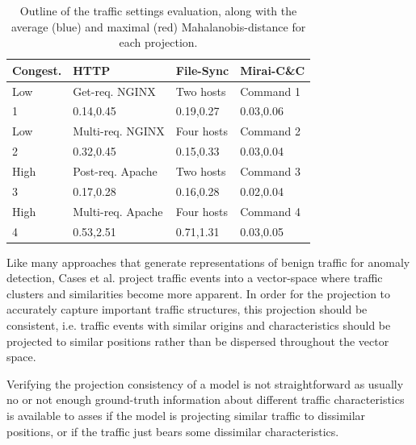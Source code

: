 \documentclass[conference]{IEEEtran}
\begin{document}
\begin{table}
\centering
\begin{tabular}{p{1cm}|p{2.3cm}|p{1.5cm}|p{1.6cm}}
Congest.&HTTP&File-Sync & Mirai-C\&C\\ \hline 
Low& Get-req. NGINX&  Two hosts & Command 1 \vspace{0.1cm} \\ \hline
1& \textcolor{myblue}{0.14}\space ,\space\space\textcolor{myred}{0.45} 
&\textcolor{myblue}{0.19}\space ,\space\space\textcolor{myred}{0.27} 
&\textcolor{myblue}{0.03}\space ,\space\space\textcolor{myred}{0.06}\\ \hline \hline
Low&Multi-req. NGINX & Four hosts & Command 2\\ \hline
2&\textcolor{myblue}{0.32}\space ,\space\space\textcolor{myred}{0.45} 
&\textcolor{myblue}{0.15}\space ,\space\space\textcolor{myred}{0.33} 
&\textcolor{myblue}{0.03}\space ,\space\space\textcolor{myred}{0.04}\\ \hline \hline
High& Post-req. Apache &Two hosts & Command 3\\ \hline
3&\textcolor{myblue}{0.17}\space ,\space\space\textcolor{myred}{0.28} 
&\textcolor{myblue}{0.16}\space ,\space\space\textcolor{myred}{0.28} 
&\textcolor{myblue}{0.02}\space ,\space\space\textcolor{myred}{0.04}\\ \hline \hline
High& Multi-req. Apache & Four hosts & Command 4\\ \hline
4&\textcolor{myblue}{0.53}\space ,\space\space\textcolor{myred}{2.51} 
&\textcolor{myblue}{0.71}\space ,\space\space\textcolor{myred}{1.31} 
&\textcolor{myblue}{0.03}\space ,\space\space\textcolor{myred}{0.05}\\ \hline \hline
\end{tabular}
\caption{Outline of the traffic settings evaluation, along with the average (blue) and maximal (red) Mahalanobis-distance for each projection.}\label{Tab:Dataset}
\end{table}

Like many approaches that generate representations of benign traffic for anomaly detection, Cases et al. project traffic events into a vector-space where traffic clusters and similarities become more apparent. In order for the projection to accurately capture important traffic structures, this projection should be consistent, i.e. traffic events with similar origins and characteristics should be projected to similar positions rather than be dispersed throughout the vector space. 

Verifying the projection consistency of a model is not straightforward as usually no or not enough ground-truth information about different traffic characteristics is available to asses if the model is projecting similar traffic to dissimilar positions, or if the traffic just bears some dissimilar characteristics.
\end{document}
